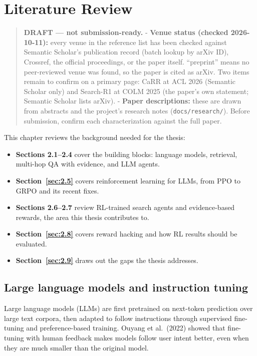 \chapter{Literature Review}\label{sec:2}

\begin{quote}
\textbf{DRAFT --- not submission-ready.} - \textbf{Venue status (checked
2026-10-11):} every venue in the reference list has been checked against
Semantic Scholar's publication record (batch lookup by arXiv ID),
Crossref, the official proceedings, or the paper itself. ``preprint''
means no peer-reviewed venue was found, so the paper is cited as arXiv.
Two items remain to confirm on a primary page: CaRR at ACL 2026
(Semantic Scholar only) and Search-R1 at COLM 2025 (the paper's own
statement; Semantic Scholar lists arXiv). - \textbf{Paper descriptions:}
these are drawn from abstracts and the project's research notes
(\texttt{docs/\allowbreak{}research/\allowbreak{}}). Before submission,
confirm each characterization against the full paper.
\end{quote}

This chapter reviews the background needed for the thesis:

\begin{itemize}
\tightlist
\item
  \textbf{Sections 2.1--2.4} cover the building blocks: language models,
  retrieval, multi-hop QA with evidence, and LLM agents.
\item
  \textbf{Section~\ref{sec:2.5}} covers reinforcement learning for LLMs,
  from PPO to GRPO and its recent fixes.
\item
  \textbf{Sections 2.6--2.7} review RL-trained search agents and
  evidence-based rewards, the area this thesis contributes to.
\item
  \textbf{Section~\ref{sec:2.8}} covers reward hacking and how RL
  results should be evaluated.
\item
  \textbf{Section~\ref{sec:2.9}} draws out the gaps the thesis
  addresses.
\end{itemize}

\section{Large language models and instruction tuning}\label{sec:2.1}

Large language models (LLMs) are first pretrained on next-token
prediction over large text corpora, then adapted to follow instructions
through supervised fine-tuning and preference-based training. Ouyang et
al.~(2022) showed that fine-tuning with human feedback makes models
follow user intent better, even when they are much smaller than the
original model.

